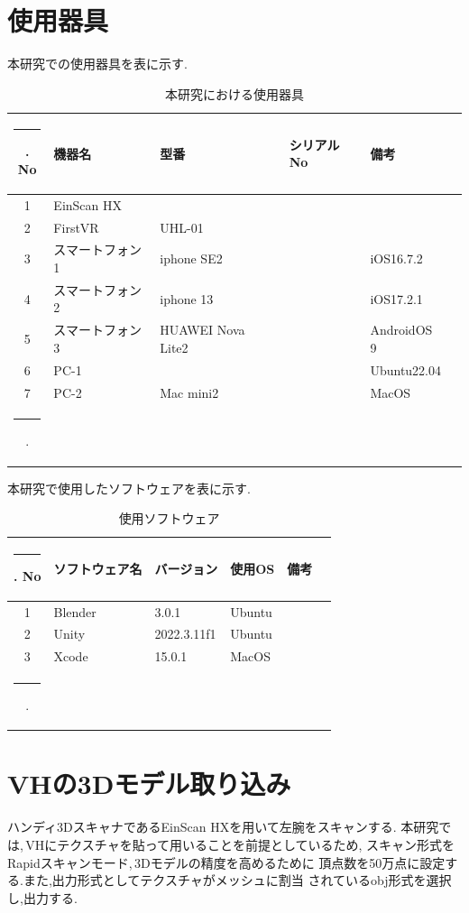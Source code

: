 \documentclass{ltjsreport}
\makeatletter
\def\Hline{
  \noalign{\ifnum0=`}\fi\hrule \@height 3.\arrayrulewidth \futurelet
  \reserved@a\@xhline}
\makeatother
\begin{document}
	\section{使用器具}
		本研究での使用器具を表に示す.
	\begin{table}[H]
	\begin{center}
	\caption{本研究における使用器具}
	\label{tab:usedev}
	\begin{tabular}{clllll} \Hline
	No&\multicolumn{1}{l}{機器名}&\multicolumn{1}{l}{型番}&\multicolumn{1}{l}{シリアルNo}&\multicolumn{1}{l}{備考}\\ \hline
	1&EinScan HX&&&\\
	2&FirstVR&UHL-01&&\\
	3&スマートフォン1&iphone SE2&&iOS16.7.2\\
	4&スマートフォン2&iphone 13&&iOS17.2.1\\
	5&スマートフォン3&HUAWEI Nova Lite2&&AndroidOS 9\\
	6&PC-1&&&Ubuntu22.04\\
	7&PC-2&Mac mini2&&MacOS\\
	\Hline
	\end{tabular}
	\end{center}
	\end{table}
	本研究で使用したソフトウェアを表に示す.
	\begin{table}[H]
	\begin{center}
	\caption{使用ソフトウェア}
	\label{tab:usesoft}
	\begin{tabular}{clllll} \Hline
	No&\multicolumn{1}{l}{ソフトウェア名}&\multicolumn{1}{l}{バージョン}&\multicolumn{1}{l}{使用OS}&\multicolumn{1}{l}{備考}\\ \hline
	1&Blender&3.0.1&Ubuntu&\\
	2&Unity&2022.3.11f1&Ubuntu&\\
	3&Xcode&15.0.1&MacOS&\\
	\Hline
	\end{tabular}
	\end{center}
	\end{table}
\vspace{-15pt}
	\section{VHの3Dモデル取り込み}
		ハンディ3DスキャナであるEinScan HXを用いて左腕をスキャンする.
		本研究では,\,VHにテクスチャを貼って用いることを前提としているため,
		スキャン形式をRapidスキャンモード,\,3Dモデルの精度を高めるために
		頂点数を50万点に設定する.また,出力形式としてテクスチャがメッシュに割当
		されているobj形式を選択し,出力する.
\end{document}
